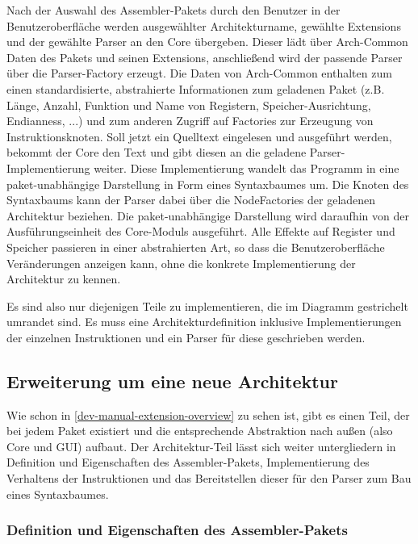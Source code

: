 Nach der Auswahl des Assembler-Pakets durch den Benutzer in der
Benutzeroberfläche werden ausgewählter Architekturname, gewählte Extensions und
der gewählte Parser an den Core übergeben. Dieser lädt über Arch-Common Daten
des Pakets und seinen Extensions, anschließend wird der passende Parser über die
Parser-Factory erzeugt. Die Daten von Arch-Common enthalten zum einen
standardisierte, abstrahierte Informationen zum geladenen Paket (z.B. Länge,
Anzahl, Funktion und Name von Registern, Speicher-Ausrichtung, Endianness, ...)
und zum anderen Zugriff auf Factories zur Erzeugung von Instruktionsknoten. Soll
jetzt ein Quelltext eingelesen und ausgeführt werden, bekommt der Core den Text
und gibt diesen an die geladene Parser-Implementierung weiter. Diese
Implementierung wandelt das Programm in eine paket-unabhängige Darstellung
in Form eines Syntaxbaumes um. Die Knoten des Syntaxbaums kann der Parser dabei
über die NodeFactories der geladenen Architektur beziehen. Die paket-unabhängige
Darstellung wird daraufhin von der Ausführungseinheit des Core-Moduls
ausgeführt. Alle Effekte auf Register und Speicher passieren in einer
abstrahierten Art, so dass die Benutzeroberfläche Veränderungen anzeigen kann,
ohne die konkrete Implementierung der Architektur zu kennen.

Es sind also nur diejenigen Teile zu implementieren, die im Diagramm gestrichelt
umrandet sind. Es muss eine Architekturdefinition inklusive Implementierungen
der einzelnen Instruktionen und ein Parser für diese geschrieben werden.

\subsection{Erweiterung um eine neue Architektur}

Wie schon in \autoref{dev-manual-extension-overview} zu sehen ist, gibt es einen
Teil, der bei jedem Paket existiert und die entsprechende Abstraktion nach außen
(also Core und GUI) aufbaut. Der Architektur-Teil lässt sich weiter
untergliedern in Definition und Eigenschaften des Assembler-Pakets,
Implementierung des Verhaltens der Instruktionen und das Bereitstellen dieser
für den Parser zum Bau eines Syntaxbaumes.

\subsubsection{Definition und Eigenschaften des Assembler-Pakets}

